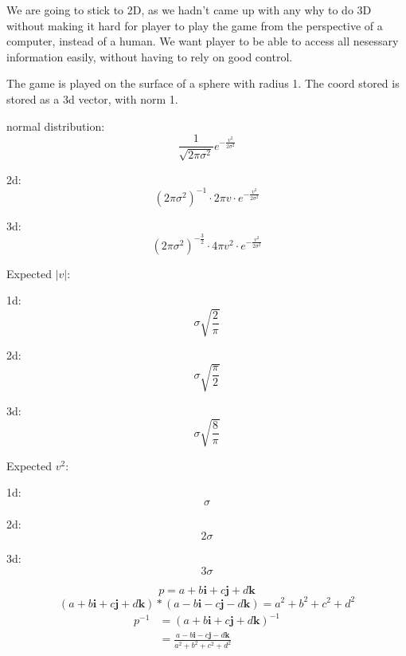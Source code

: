 \documentclass[a4paper, 12pt]{article}
\newcommand{\ui}{\mathbf{i}}
\newcommand{\uj}{\mathbf{j}}
\newcommand{\uk}{\mathbf{k}}
\newcommand{\quat}[4]{#1#2\ui#3\uj#4\uk}
\newcommand{\quats}[4]{#1+#2\ui+#3\uj+#4\uk}
\begin{document}
We are going to stick to 2D, as we hadn't came up with any why to do 3D without making it hard for player to play the game from the perspective of a computer, instead of a human. We want player to be able to access all nesessary information easily, without having to rely on good control.

The game is played on the surface of a sphere with radius 1. The coord stored is stored as a 3d vector, with norm 1.

\clearpage
normal distribution:
\[\frac{1}{\sqrt{2\pi\sigma^2}}e^{-\frac{v^2}{2\sigma^2}}\]

2d:
\[(2\pi\sigma^2)^{-1}\cdot 2\pi v\cdot e^{-\frac{v^2}{2\sigma^2}}\]

3d:
\[(2\pi\sigma^2)^{-\frac{3}{2}}\cdot 4\pi v^2\cdot e^{-\frac{v^2}{2\sigma^2}}\]

Expected $|v|$:

1d:
\[\sigma\sqrt{\frac{2}{\pi}}\]

2d:
\[\sigma\sqrt{\frac{\pi}{2}}\]

3d:
\[\sigma\sqrt{\frac{8}{\pi}}\]

Expected $v^2$:

1d:
\[\sigma\]

2d:
\[2\sigma\]

3d:
\[3\sigma\]

\clearpage
\[p = \quats{a}{b}{c}{d}\]
\[(\quats{a}{b}{c}{d}) * (\quat{a}{-b}{-c}{-d}) = a^2+b^2+c^2+d^2\]
\begin{align*}
  p^{-1}
  & = (\quats{a}{b}{c}{d})^{-1} \\
  & = \frac{\quat{a}{-b}{-c}{-d}}{a^2+b^2+c^2+d^2}
\end{align*}
\end{document}
